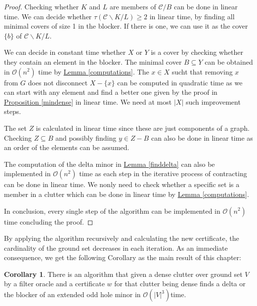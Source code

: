 \documentclass[a4paper, 12pt]{scrbook}
\theoremstyle{definition}
\newtheorem{corollary}[theorem]{Corollary}
\begin{document}
\begin{proof}
       Checking whether $K$ and $L$ are members of $\mathcal{C}/B$ can be done in linear time.
       We can decide whether $\tau(\mathcal{C}\backslash K / L)\geq 2$ in linear time, by finding all minimal covers of size 1 in the blocker. If there is one, we can use it as the cover $\{b\}$ of $\mathcal{C}\backslash K / L$.

       We can decide in constant time whether $X$ or $Y$ is a cover by checking whether they contain an element in the blocker.
       The minimal cover $B \subseteq Y$ can be obtained in $\mathcal{O}(n^2)$ time by \hyperref[computations]{Lemma \ref*{computations}}.
       The $x \in X$ sucht that removing $x$ from $G$ does not disconnect $X - \{x\}$ can be computed in quadratic time as we can start with any element and find a better one given by the proof in \hyperref[mindense]{Proposition \ref*{mindense}} in linear time. We need at most $|X|$ such improvement steps.

       The set $Z$ is calculated in linear time since these are just components of a graph.
       Checking $Z \subseteq B$ and possibly finding $y \in Z-B$ can also be done in linear time as an order of the elements can be assumed.

       The computation of the delta minor in \hyperref[finddelta]{Lemma \ref*{finddelta}} can also be implemented in $\mathcal{O}(n^2)$ time as each step in the iterative process of contracting can be done in linear time. We nonly need to check whether a specific set is a member in a clutter which can be done in linear time by \hyperref[computations]{Lemma \ref*{computations}}.

       In conclusion, every single step of the algorithm can be implemented in $\mathcal{O}(n^2)$ time concluding the proof.
   \end{proof}

   By applying the algorithm recursively and calculating the new certificate, the cardinality of the ground set decreases in each iteration. As an immediate consequence, we get the following Corollary as the main result of this chapter:

   \begin{corollary}
       There is an algorithm that given a dense clutter over ground set $V$ by a filter oracle and a certificate $w$ for that clutter being dense finds a delta or the blocker of an extended odd hole minor in $\mathcal{O}(|V|^3)$time.
   \end{corollary}





   \printbibliography[title={References}]
   \printindex
\end{document}
